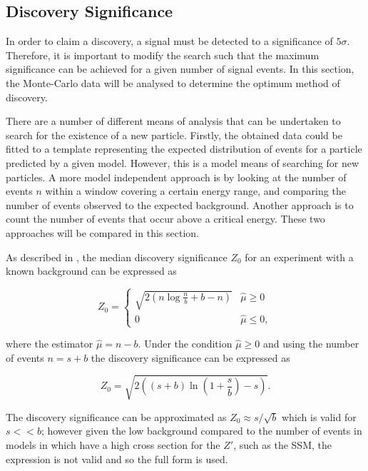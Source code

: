 \documentclass{article}
\begin{document}
\subsection{Discovery Significance}

In order to claim a discovery, a signal must be detected to a significance of $5\sigma$. Therefore, it is important to modify the search such that the maximum significance can be achieved for a given number of signal events. In this section, the Monte-Carlo data will be analysed to determine the optimum method of discovery.

There are a number of different means of analysis that can be undertaken to search for the existence of a new particle. Firstly, the obtained data could be fitted to a template representing the expected distribution of events for a particle predicted by a given model. However, this is a model  means of searching for new particles. A more model independent approach is by looking at the number of events $n$ within a window covering a certain energy range, and comparing the number of events observed to the expected background. Another approach is to count the number of events that occur above a critical energy. These two approaches will be compared in this section.

As described in \cite{Cowan:2010js}, the median discovery significance $Z_0$ for an experiment with a known background can be expressed as

\begin{equation}
Z_0 = \begin{cases}
    \sqrt{2\left(n\log\frac{n}{b}+b-n \right)} & \widehat{\mu}\geq0\\        0         & \widehat{\mu}\leq0,
\end{cases}
\end{equation}

where the estimator $\widehat{\mu}=n-b$. Under the condition $\widehat{\mu}\geq0$ and using the number of events $n=s+b$ the discovery significance can be expressed as 

\begin{equation}
Z_0 = \sqrt{2\left(  (s+b)\ln\left(1+\frac{s}{b}\right)  - s \right)}.
\label{eqn:asimov}
\end{equation}

The discovery significance can be approximated as $Z_0\approx s/\sqrt{b}$ which is valid for $s<<b$; however given the low background compared to the number of events in models in which have a high cross section for the $Z'$, such as the SSM, the expression is not valid and so the full form is used.
\end{document}
